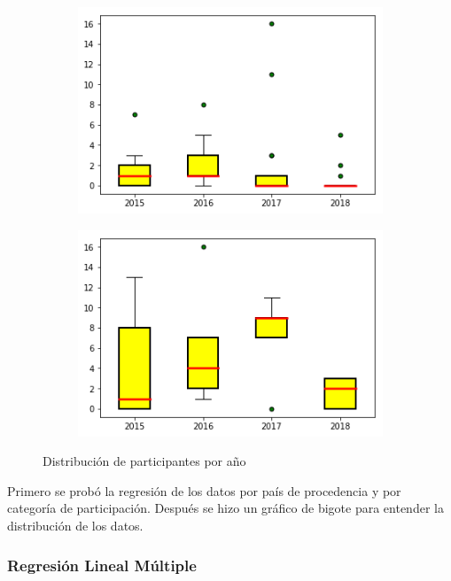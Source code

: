 \documentclass[5p,times]{elsarticle}
\begin{document}
\begin{figure}[H]
\centering
\begin{subfigure}[b]{0.2375\textwidth}
\includegraphics[width=\textwidth]{05}
\end{subfigure}
\hfill
\begin{subfigure}[b]{0.2375\textwidth}
\includegraphics[width=\textwidth]{06}
\end{subfigure}
\caption{Distribución de participantes por año}\label{fig:MRLDist}
\end{figure}

Primero se probó la regresión de los datos por país de procedencia y por categoría de participación. Después se hizo un gráfico de bigote para entender la distribución de los datos.


\subsubsection*{Regresión Lineal Múltiple}
\end{document}
